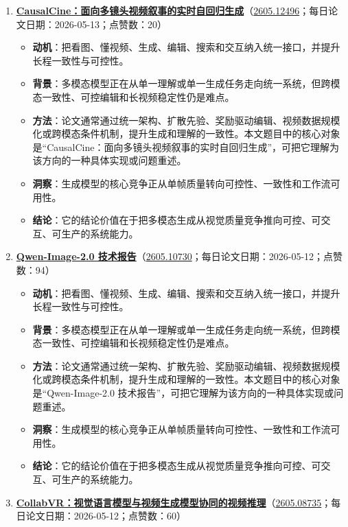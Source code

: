 \begin{enumerate}[leftmargin=1.5em]
\begin{itemize}[leftmargin=1.5em]
  \end{itemize}
  \item \textbf{\href{https://huggingface.co/papers/2605.12496}{CausalCine：面向多镜头视频叙事的实时自回归生成}}（\href{https://arxiv.org/abs/2605.12496}{2605.12496}；每日论文日期：2026-05-13；点赞数：20）
  \begin{itemize}[leftmargin=1.5em]
    \item \textbf{动机}：把看图、懂视频、生成、编辑、搜索和交互纳入统一接口，并提升长程一致性与可控性。
    \item \textbf{背景}：多模态模型正在从单一理解或单一生成任务走向统一系统，但跨模态一致性、可控编辑和长视频稳定性仍是难点。
    \item \textbf{方法}：论文通常通过统一架构、扩散先验、奖励驱动编辑、视频数据规模化或跨模态条件机制，提升生成和理解的一致性。本文题目中的核心对象是“CausalCine：面向多镜头视频叙事的实时自回归生成”，可把它理解为该方向的一种具体实现或问题重述。
    \item \textbf{洞察}：生成模型的核心竞争正从单帧质量转向可控性、一致性和工作流可用性。
    \item \textbf{结论}：它的结论价值在于把多模态生成从视觉质量竞争推向可控、可交互、可生产的系统能力。
  \end{itemize}
  \item \textbf{\href{https://huggingface.co/papers/2605.10730}{Qwen-Image-2.0 技术报告}}（\href{https://arxiv.org/abs/2605.10730}{2605.10730}；每日论文日期：2026-05-12；点赞数：94）
  \begin{itemize}[leftmargin=1.5em]
    \item \textbf{动机}：把看图、懂视频、生成、编辑、搜索和交互纳入统一接口，并提升长程一致性与可控性。
    \item \textbf{背景}：多模态模型正在从单一理解或单一生成任务走向统一系统，但跨模态一致性、可控编辑和长视频稳定性仍是难点。
    \item \textbf{方法}：论文通常通过统一架构、扩散先验、奖励驱动编辑、视频数据规模化或跨模态条件机制，提升生成和理解的一致性。本文题目中的核心对象是“Qwen-Image-2.0 技术报告”，可把它理解为该方向的一种具体实现或问题重述。
    \item \textbf{洞察}：生成模型的核心竞争正从单帧质量转向可控性、一致性和工作流可用性。
    \item \textbf{结论}：它的结论价值在于把多模态生成从视觉质量竞争推向可控、可交互、可生产的系统能力。
  \end{itemize}
  \item \textbf{\href{https://huggingface.co/papers/2605.08735}{CollabVR：视觉语言模型与视频生成模型协同的视频推理}}（\href{https://arxiv.org/abs/2605.08735}{2605.08735}；每日论文日期：2026-05-12；点赞数：60）

\end{enumerate}

